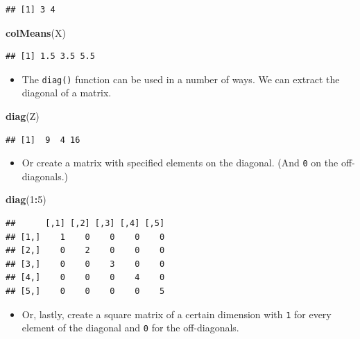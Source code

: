 \documentclass[]{book}
\newenvironment{Shaded}{\begin{snugshade}}{\end{snugshade}}
\newcommand{\KeywordTok}[1]{\textcolor[rgb]{0.13,0.29,0.53}{\textbf{#1}}}
\newcommand{\DecValTok}[1]{\textcolor[rgb]{0.00,0.00,0.81}{#1}}
\newcommand{\OperatorTok}[1]{\textcolor[rgb]{0.81,0.36,0.00}{\textbf{#1}}}
\newcommand{\NormalTok}[1]{#1}
\providecommand{\tightlist}{%
  \setlength{\itemsep}{0pt}\setlength{\parskip}{0pt}}
\begin{document}
\begin{verbatim}
## [1] 3 4
\end{verbatim}

\begin{Shaded}
\begin{Highlighting}[]
\KeywordTok{colMeans}\NormalTok{(X)}
\end{Highlighting}
\end{Shaded}

\begin{verbatim}
## [1] 1.5 3.5 5.5
\end{verbatim}

\begin{itemize}
\tightlist
\item
  The \texttt{diag()} function can be used in a number of ways. We can
  extract the diagonal of a matrix.
\end{itemize}

\begin{Shaded}
\begin{Highlighting}[]
\KeywordTok{diag}\NormalTok{(Z)}
\end{Highlighting}
\end{Shaded}

\begin{verbatim}
## [1]  9  4 16
\end{verbatim}

\begin{itemize}
\tightlist
\item
  Or create a matrix with specified elements on the diagonal. (And
  \texttt{0} on the off-diagonals.)
\end{itemize}

\begin{Shaded}
\begin{Highlighting}[]
\KeywordTok{diag}\NormalTok{(}\DecValTok{1}\OperatorTok{:}\DecValTok{5}\NormalTok{)}
\end{Highlighting}
\end{Shaded}

\begin{verbatim}
##      [,1] [,2] [,3] [,4] [,5]
## [1,]    1    0    0    0    0
## [2,]    0    2    0    0    0
## [3,]    0    0    3    0    0
## [4,]    0    0    0    4    0
## [5,]    0    0    0    0    5
\end{verbatim}

\begin{itemize}
\tightlist
\item
  Or, lastly, create a square matrix of a certain dimension with
  \texttt{1} for every element of the diagonal and \texttt{0} for the
  off-diagonals.
\end{itemize}
\end{document}
